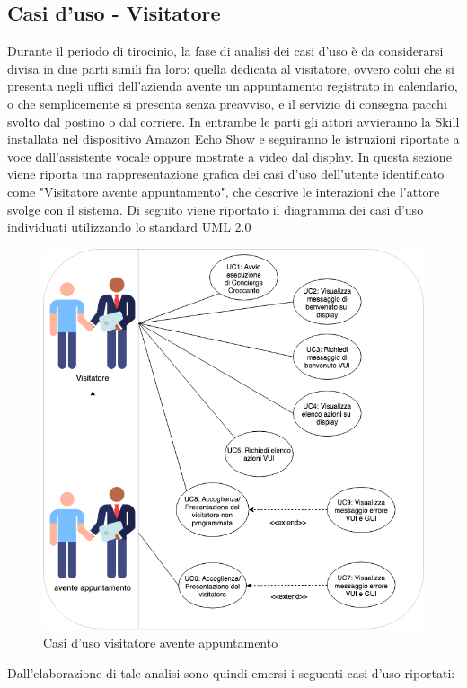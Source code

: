 \subsection{Casi d'uso - Visitatore}
Durante il periodo di tirocinio, la fase di analisi dei casi d'uso è da considerarsi divisa in due parti simili fra loro: quella dedicata al visitatore, ovvero colui che si presenta negli uffici dell'azienda avente un appuntamento registrato in calendario, o che semplicemente si presenta senza preavviso, e il servizio di consegna pacchi svolto dal postino o dal corriere. In entrambe le parti gli attori avvieranno la Skill installata nel dispositivo Amazon Echo Show e seguiranno le istruzioni riportate a voce dall'assistente vocale oppure mostrate a video dal display. In questa sezione viene riporta una rappresentazione grafica dei casi d'uso dell'utente identificato come "Visitatore avente appuntamento", che descrive le interazioni che l'attore svolge con il sistema. Di seguito viene riportato il diagramma dei casi d'uso individuati utilizzando lo standard UML 2.0
\begin{figure}[H] 
    \centering 
    \includegraphics[width=1\columnwidth]{immagini/casi_duso1.png}
    \caption{\label{fig:casi_duso_visitatore}Casi d'uso visitatore avente appuntamento}
\end{figure}
Dall'elaborazione di tale analisi sono quindi emersi i seguenti casi d'uso riportati:
